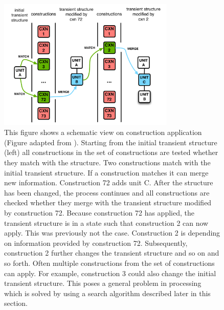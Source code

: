 \begin{figure}
\begin{center}
\includegraphics[width=0.75\textwidth]{figs/high-level-cxn-application}
\end{center}
\caption[Construction application]{This figure shows a schematic view on 
construction application (Figure adapted from \citealt{steels2011design}).
Starting from the initial transient structure (left)
all constructions in the set of constructions are tested whether they 
match with the structure. Two constructions match with the
initial transient structure. If a construction matches it 
can merge new information. Construction 72 adds 
unit C. After the structure has been changed, the process continues
and all constructions are checked whether they merge with
the transient structure modified by construction 72.
Because construction 72 has applied, the transient
structure is in a state such that construction 2 can now apply. 
This was previously not the case. Construction 2 is depending on
information provided by construction 72. Subsequently, construction 2 
further changes the transient structure and so on and so forth.
Often multiple constructions from the set of constructions can apply.
For example, construction 3 could also change the initial transient structure.
This poses a general problem in processing which is solved
by using a search algorithm described later in this section.}
\label{f:cxn-application}
\end{figure}

